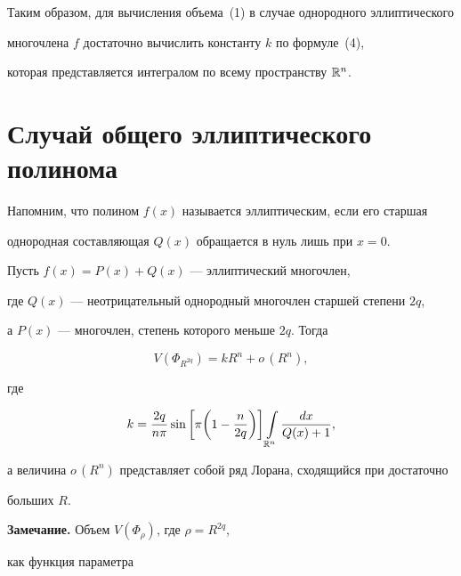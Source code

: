 Таким образом, для вычисления объема~(1) в случае однородного эллиптического


многочлена $f$ достаточно вычислить константу $k$ по формуле~(4),


которая представляется интегралом по всему пространству ${\Bbb R}^n$.





\section{Случай общего эллиптического полинома}





Напомним, что полином $f(x)$ называется эллиптическим, если его старшая


однородная составляющая $Q(x)$ обращается в нуль лишь при $x=0$.





\begin{thm}


Пусть $f(x)=P(x)+Q(x)$ --- эллиптический многочлен,


где $Q(x)$ --- неотрицательный однородный многочлен старшей степени $2q$,


а $P(x)$ --- многочлен, степень которого меньше $2q$. Тогда


$$


V(\Phi_{R^{2q}})=kR^n+o\,(R^n),


$$


где


\begin{equation}


k=\frac{2q}{n\pi}\sin\bigg[\pi\bigg(1-\frac{n}{2q}


\bigg)\bigg]\int\limits_


{{\Bbb R}^n}\frac{dx}{Q(x)+1},


\end{equation}


а величина $o\,(R^n)$ представляет собой ряд Лорана, сходящийся при достаточно


больших $R$.


\end{thm}





{\bf Замечание.} Объем $V(\Phi_{\rho})$, где $\rho=R^{2q}$,


как функция параметра


